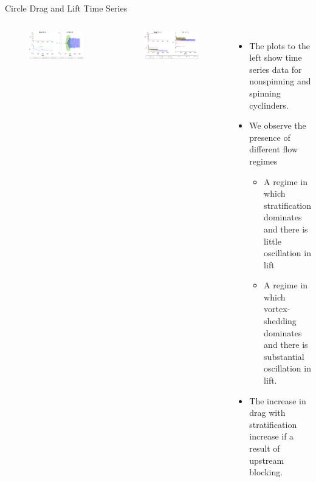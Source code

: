 \documentclass[aspectratio=169,xcolor=dvipsnames]{beamer}
\begin{document}

\begin{frame}{Circle Drag and Lift Time Series}
    \begin{columns}[c]
        \begin{figure}
            \includegraphics[width=.7\textwidth]{figures/timens.pdf}
        \end{figure}
        \begin{figure}
            \includegraphics[width=.7\textwidth]{figures/times.pdf}
        \end{figure}
        \begin{itemize}
            \item The plots to the left show time series data for nonspinning and spinning cyclinders.
            \item We observe the presence of different flow regimes
            \begin{itemize}
                \item A regime in which stratification dominates and there is little oscillation in lift
                \item A regime in which vortex-shedding dominates and there is substantial oscillation in lift.
            \end{itemize}
            \item The increase in drag with stratification increase if a result of upstream blocking.  
        \end{itemize}
    \end{columns}
\end{frame}
\end{document}
